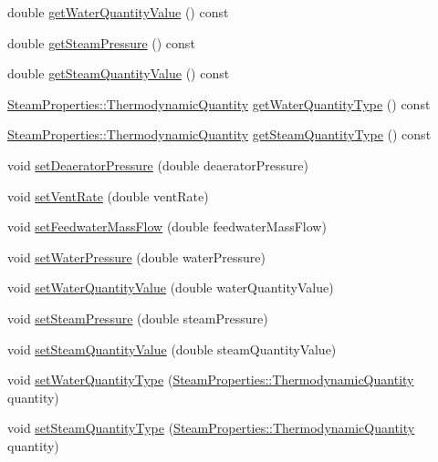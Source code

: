 \begin{DoxyCompactItemize}
double \hyperlink{class_deaerator_a9362430fb04802b6f14c9bf09d62a466}{get\+Water\+Quantity\+Value} () const
\item 
double \hyperlink{class_deaerator_aebe779c63cace193d040f497e3b70728}{get\+Steam\+Pressure} () const
\item 
double \hyperlink{class_deaerator_a5473feedca64e7c44143d422ed3e2401}{get\+Steam\+Quantity\+Value} () const
\item 
\hyperlink{class_steam_properties_ae0294bedf7d178c2d8fb6aed0f62fbff}{Steam\+Properties\+::\+Thermodynamic\+Quantity} \hyperlink{class_deaerator_a414282f81906e09a28bc75cf51659ec2}{get\+Water\+Quantity\+Type} () const
\item 
\hyperlink{class_steam_properties_ae0294bedf7d178c2d8fb6aed0f62fbff}{Steam\+Properties\+::\+Thermodynamic\+Quantity} \hyperlink{class_deaerator_a18abbdc5ec78f71e1d2495b0c64c77ec}{get\+Steam\+Quantity\+Type} () const
\item 
void \hyperlink{class_deaerator_a5b20d3aba98b21928cce70b45e843ff3}{set\+Deaerator\+Pressure} (double deaerator\+Pressure)
\item 
void \hyperlink{class_deaerator_a11e71194f58763a57ec0f7d05a21782d}{set\+Vent\+Rate} (double vent\+Rate)
\item 
void \hyperlink{class_deaerator_ada95cb2557bc43602d7bcefbad66c853}{set\+Feedwater\+Mass\+Flow} (double feedwater\+Mass\+Flow)
\item 
void \hyperlink{class_deaerator_ae23f64c6983daed388a73c033a15e176}{set\+Water\+Pressure} (double water\+Pressure)
\item 
void \hyperlink{class_deaerator_ac31cf2deb8bf30ee6921d1d9f8281eb8}{set\+Water\+Quantity\+Value} (double water\+Quantity\+Value)
\item 
void \hyperlink{class_deaerator_a5936221e68b5ba3245f0adabed74e6d7}{set\+Steam\+Pressure} (double steam\+Pressure)
\item 
void \hyperlink{class_deaerator_a101399a8b66c3ff1fecf884fd1b1373d}{set\+Steam\+Quantity\+Value} (double steam\+Quantity\+Value)
\item 
void \hyperlink{class_deaerator_ac60ad3d6650ed6c7783d18833bb7e3dd}{set\+Water\+Quantity\+Type} (\hyperlink{class_steam_properties_ae0294bedf7d178c2d8fb6aed0f62fbff}{Steam\+Properties\+::\+Thermodynamic\+Quantity} quantity)
\item 
void \hyperlink{class_deaerator_a1aa3b3de064d148479af9576e717b6c2}{set\+Steam\+Quantity\+Type} (\hyperlink{class_steam_properties_ae0294bedf7d178c2d8fb6aed0f62fbff}{Steam\+Properties\+::\+Thermodynamic\+Quantity} quantity)

\end{DoxyCompactItemize}
